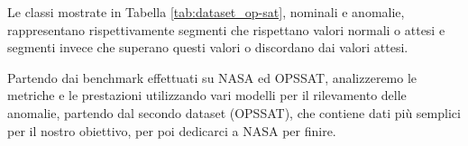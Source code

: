 Le classi mostrate in Tabella \ref{tab:dataset_op-sat}, nominali e anomalie, rappresentano rispettivamente segmenti che rispettano valori normali o attesi e segmenti invece che superano questi valori o discordano dai valori attesi.

Partendo dai benchmark effettuati su NASA ed OPS\textunderscore SAT, analizzeremo le metriche e le prestazioni utilizzando vari modelli per il rilevamento delle anomalie, partendo dal secondo dataset (OPS\textunderscore SAT), che contiene dati più semplici per il nostro obiettivo, per poi dedicarci a NASA per finire.


